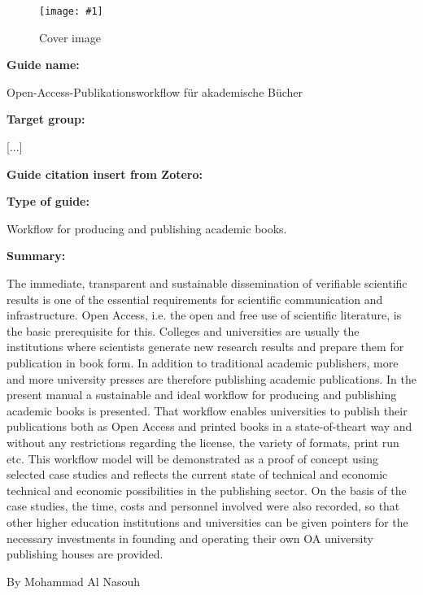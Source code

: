 \documentclass{article}
\newlength{\imgwidth}
\newcommand\scaledgraphics[2]{%
                
\settowidth{\imgwidth}{\texttt{[image: \#1]}}%
                
\setlength{\imgwidth}{\minof{\imgwidth}{#2\textwidth}}%
                
\texttt{[image: \#1]}%
                
}
\begin{document}
\begin{center}
\begin{figure}
\scaledgraphics{39363ae5-01d9-4e5a-a46f-bf20971df65a.jpg}{0.5}
\caption*{Cover image}\label{F7674061}
\end{figure}


\end{center}




\textbf{Guide name:} 

Open-Access-Publikationsworkflow für akademische Bücher


\textbf{Target group:}

[...]


\textbf{Guide citation insert from Zotero:}

\autocite{bohm_open-access-publikationsworkflow_2020}


\textbf{Type of guide: }

Workflow for producing and publishing academic books.


\textbf{Summary: }

The immediate, transparent and sustainable dissemination of verifiable scientific results is one of the essential requirements for scientific communication and infrastructure. Open Access, i.e. the open and free use of scientific literature, is the basic prerequisite for this. Colleges and universities are usually the institutions where scientists generate new research results and prepare them for publication in book form. In addition to traditional academic publishers, more and more university presses are therefore publishing academic publications. In the present manual a sustainable and ideal workflow for producing and publishing academic books is presented. That workflow enables universities to publish their publications both as Open Access and printed books in a state-of-theart way and without any restrictions regarding the license, the variety of formats, print run etc. This workflow model will be demonstrated as a proof of concept using selected case studies and reflects the current state of technical and economic technical and economic possibilities in the publishing sector. On the basis of the case studies, the time, costs and personnel involved were also recorded, so that other higher education institutions and universities can be given pointers for the necessary investments in founding and operating their own OA university publishing houses are provided.


By Mohammad Al Nasouh





\printbibliography[title={Literaturverzeichnis}]
\end{document}
